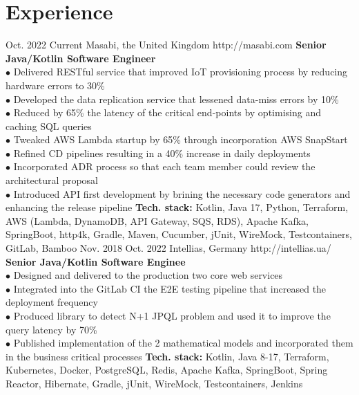 \documentclass[10pt]{article} %
\begin{document}
\section{Experience}
\job
{Oct. 2022 }{ Current}
{Masabi, the United Kingdom}
{http://masabi.com}
{\textbf{Senior Java/Kotlin Software Engineer}}
{
\textbf{}   
\\$\bullet$ Delivered RESTful service that improved IoT provisioning process by reducing hardware errors to 30\%
\\$\bullet$ Developed the data replication service that lessened data-miss errors by 10\% 
\\$\bullet$ Reduced by 65\% the latency of the critical end-points by optimising and caching SQL queries
\\$\bullet$ Tweaked AWS Lambda startup by 65\% through incorporation AWS SnapStart
\\$\bullet$ Refined CD pipelines resulting in a 40\% increase in daily deployments
\\$\bullet$ Incorporated ADR process so that each team member could review the architectural proposal
\\$\bullet$ Introduced API first development by brining the necessary code generators and enhancing the release pipeline
\vadjust{\vspace{4pt}}
\newline
\textbf{Tech. stack: }{Kotlin, Java 17, Python, Terraform, AWS (Lambda, DynamoDB, API Gateway, SQS, RDS), Apache Kafka, SpringBoot, http4k, Gradle, Maven, Cucumber, jUnit, WireMock, Testcontainers, GitLab, Bamboo}   
 }
\job
{Nov. 2018 }{ Oct. 2022}
{Intellias, Germany}
{http://intellias.ua/}
{\textbf{Senior Java/Kotlin Software Enginee}}
{
\textbf{}   
\\$\bullet$ Designed and delivered to the production two core web services
\\$\bullet$ Integrated into the GitLab CI the E2E testing pipeline that increased the deployment frequency
\\$\bullet$ Produced library to detect N+1 JPQL problem and used it to improve the query latency by 70\% 
\\$\bullet$ Published implementation of the 2 mathematical models and incorporated them in the business critical processes
\vadjust{\vspace{4pt}}
\textbf{Tech. stack: }{Kotlin, Java 8-17, Terraform, Kubernetes, Docker, PostgreSQL, Redis, Apache Kafka, SpringBoot, Spring Reactor, Hibernate, Gradle, jUnit, WireMock, Testcontainers, Jenkins}   
 }
\end{document}
